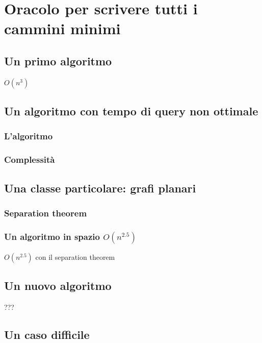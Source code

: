 \documentclass[a4paper,10pt]{amsbook}
\theoremstyle{plain}
\theoremstyle{definition}
\theoremstyle{remark}
\begin{document}
\chapter{Oracolo per scrivere tutti i cammini minimi}
\label{chap:oracolotutticammini}

\section{Un primo algoritmo}

$O(n^3)$

\section{Un algoritmo con tempo di query non ottimale}

\subsection{L'algoritmo}

\subsection{Complessità}

\section{Una classe particolare: grafi planari}

\subsection{Separation theorem}

\subsection{Un algoritmo in spazio $O(n^{2.5})$}

$O(n^{2.5})$ con il separation theorem

\section{Un nuovo algoritmo}

???

\section{Un caso difficile}





\end{document}
